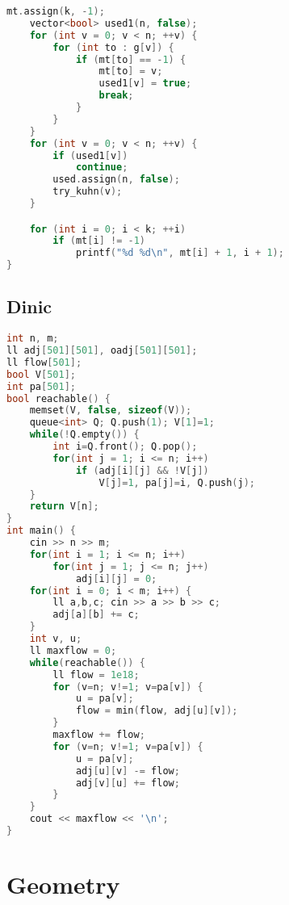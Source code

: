 \documentclass[10pt,a4paper,landscape]{article}
\begin{document}
\begin{multicols}{3}
\begin{lstlisting}[language=C++, breaklines=true]
    mt.assign(k, -1);
    vector<bool> used1(n, false);
    for (int v = 0; v < n; ++v) {
        for (int to : g[v]) {
            if (mt[to] == -1) {
                mt[to] = v;
                used1[v] = true;
                break;
            }
        }
    }
    for (int v = 0; v < n; ++v) {
        if (used1[v])
            continue;
        used.assign(n, false);
        try_kuhn(v);
    }

    for (int i = 0; i < k; ++i)
        if (mt[i] != -1)
            printf("%d %d\n", mt[i] + 1, i + 1);
}
\end{lstlisting}

\subsection{Dinic}
\begin{lstlisting}[language=C++, breaklines=true]
int n, m;
ll adj[501][501], oadj[501][501];
ll flow[501];
bool V[501];
int pa[501];
bool reachable() {
    memset(V, false, sizeof(V));
    queue<int> Q; Q.push(1); V[1]=1;
    while(!Q.empty()) {
        int i=Q.front(); Q.pop();
        for(int j = 1; i <= n; i++)
            if (adj[i][j] && !V[j])
                V[j]=1, pa[j]=i, Q.push(j);
    }
    return V[n];
}
int main() {
    cin >> n >> m;
    for(int i = 1; i <= n; i++)
        for(int j = 1; j <= n; j++)
            adj[i][j] = 0;
    for(int i = 0; i < m; i++) {
        ll a,b,c; cin >> a >> b >> c;
        adj[a][b] += c;
    }
    int v, u;
    ll maxflow = 0;
    while(reachable()) {
        ll flow = 1e18;
        for (v=n; v!=1; v=pa[v]) {
            u = pa[v];
            flow = min(flow, adj[u][v]);
        }
        maxflow += flow;
        for (v=n; v!=1; v=pa[v]) {
            u = pa[v];
            adj[u][v] -= flow;
            adj[v][u] += flow;
        }
    }
    cout << maxflow << '\n';
}
\end{lstlisting}

\section{Geometry}


\end{multicols}
\end{document}
